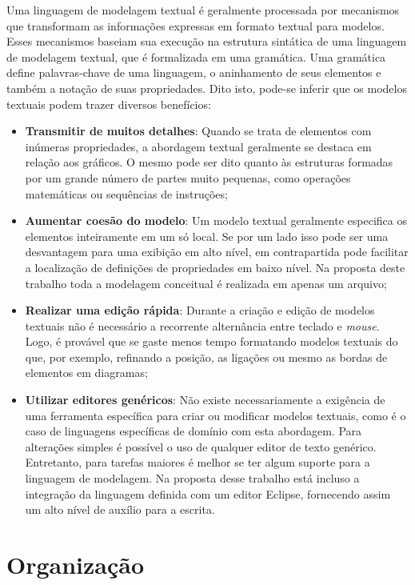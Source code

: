 Uma linguagem de modelagem textual é geralmente processada por mecanismos que transformam as informações expressas em formato textual para modelos. 
Esses mecanismos baseiam sua execução na estrutura sintática de uma linguagem de modelagem textual, que é formalizada em uma gramática. 
Uma gramática define palavras-chave de uma linguagem, o aninhamento de seus elementos e também a notação de suas propriedades. 
Dito isto, pode-se inferir que os modelos textuais podem trazer diversos benefícios:

\begin{itemize}
    \item \textbf{Transmitir de muitos detalhes}: Quando se trata de elementos com inúmeras propriedades, a abordagem textual geralmente se destaca em relação aos gráficos. 
    O mesmo pode ser dito quanto às estruturas formadas por um grande número de partes muito pequenas, como operações matemáticas ou sequências de instruções;
    \item \textbf{Aumentar coesão do modelo}: Um modelo textual geralmente especifica os elementos inteiramente em um só local. 
    Se por um lado isso pode ser uma desvantagem para uma exibição em alto nível, em contrapartida pode facilitar a localização de definições de propriedades em baixo nível. 
    Na proposta deste trabalho toda a modelagem conceitual é realizada em apenas um arquivo;
    \item \textbf{Realizar uma edição rápida}: Durante a criação e edição de modelos textuais não é necessário a recorrente alternância entre teclado e \textit{mouse}. 
    Logo, é provável que se gaste menos tempo formatando modelos textuais do que, por exemplo, refinando a posição, as ligações ou mesmo as bordas de elementos em diagramas;
    \item \textbf{Utilizar editores genéricos}: Não existe necessariamente a exigência de uma ferramenta específica para criar ou modificar modelos textuais, como é o caso de linguagens específicas de domínio com esta abordagem. 
    Para alterações simples é possível o uso de qualquer editor de texto genérico. 
    Entretanto, para tarefas maiores é melhor se ter algum suporte para a linguagem de modelagem. 
    Na proposta desse trabalho está incluso a integração da linguagem definida com um editor Eclipse, fornecendo assim um alto nível de auxílio para a escrita.
\end{itemize}


\section{Organização}

